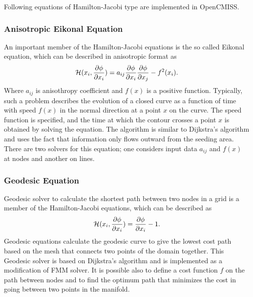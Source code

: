 Following equations of Hamilton-Jacobi type are implemented in OpenCMISS.

\subsubsection{Anisotropic Eikonal Equation}

An important member of the Hamilton-Jacobi equations is the so called Eikonal equation, which can be described in anisotropic format as 
\begin{equation}
\mathcal{H}(x_i, \dfrac{\partial \phi}{\partial x_{i}} ) = a_{ij} \dfrac{\partial \phi}{\partial x_{i}}  \dfrac{\partial \phi}{\partial x_{j}}  - f^2(x_i).
\end{equation}
Where $a_{ij}$ is anisothropy coefficient and $f(x)$ is a positive function. Typically, such a problem describes the evolution of a closed curve as a function of time with speed $f(x)$ in the normal direction at a point $x$ on the curve. The speed function is specified, and the time at which the contour crosses a point $x$ is obtained by solving the equation. The algorithm is similar to Dijkstra's algorithm and uses the fact that information only flows outward from the seeding area. There are two solvers for this equation; one considers input data $a_{ij}$ and $f(x)$ at nodes and another on lines.

\subsubsection{Geodesic Equation}

Geodesic solver to calculate the shortest path between two nodes in a grid is a member of the Hamilton-Jacobi equations, which can be described as $$ \mathcal{H}(x_i, \dfrac{\partial \phi}{\partial x_{i}} ) =  \dfrac{\partial \phi}{\partial x_{i}}  - 1.$$ Geodesic equations calculate the geodesic curve to give the lowest cost path based on the mesh that connects two points of the domain together. This Geodesic solver is based on Dijkstra's algorithm and is implemented as a modification of FMM solver. It is possible also to define a cost function $f$ on the path between nodes and to find the optimum path that minimizes the cost in going between two points in the manifold.

